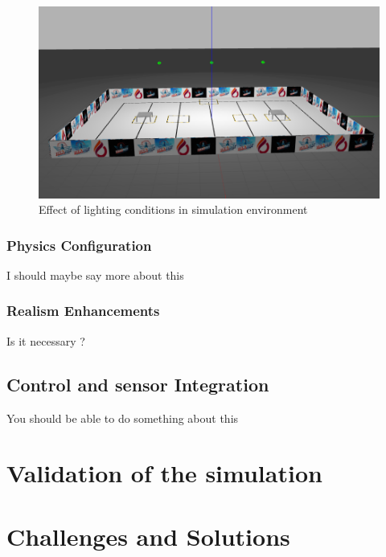 \documentclass[../../main]{subfiles}
\begin{document}
\begin{itemize}
  \begin{figure}[H]
    \centering
\includegraphics[width=\textwidth]{fig/competition_area_light.png}
\caption{Effect of lighting conditions in simulation environment}
\label{Competition area with good lighting} %
\end{figure}
   \end{itemize}

\subsubsection{Physics Configuration}  
I should maybe say more about this 
\subsubsection{Realism Enhancements}  
Is it necessary ? 

\subsection{Control and sensor Integration} 

You should be able to do something about this 

\section{Validation of the simulation}

\section{Challenges and Solutions} 
  
\end{document}
